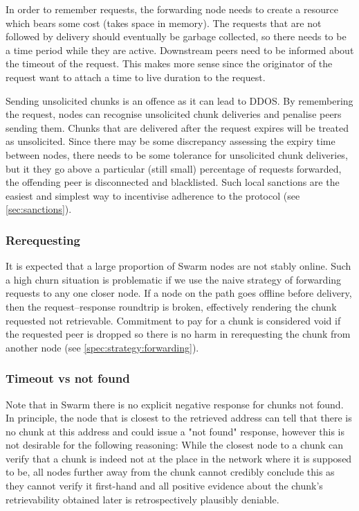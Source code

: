 In order to remember requests, the forwarding node needs to create a resource which bears some cost (takes space in memory). The requests that are not followed by delivery should eventually be garbage collected, so there needs to be a time period while they are active. Downstream peers need to be informed about the timeout of the request. This makes more sense since the originator of the request want to attach a time to live duration to the request.  

Sending unsolicited chunks is an offence as it can lead to DDOS. By remembering the request, nodes can recognise unsolicited chunk deliveries and penalise peers sending them. Chunks that are delivered after the request expires will be treated as unsolicited. Since there may be some discrepancy assessing the expiry time between nodes, there needs to be some tolerance for unsolicited chunk deliveries, but it they go above a particular (still small) percentage of requests forwarded, the offending peer is disconnected and blacklisted. Such local sanctions are the easiest and simplest way to incentivise adherence to the protocol (see \ref{sec:sanctions}). 

\subsubsection{Rerequesting}

It is expected that a large proportion of Swarm nodes are not stably online. Such a high churn situation is problematic if we use the naive strategy of forwarding requests to any one closer node. If a node on the path goes offline before delivery, then the request--response roundtrip is broken, effectively rendering the chunk requested not retrievable. Commitment to pay for a chunk is considered void if the requested peer is dropped so there is no harm in rerequesting the chunk from another node (see \ref{spec:strategy:forwarding}).


\subsubsection{Timeout vs not found}

Note that in Swarm there is no explicit negative response for chunks not found. In principle, the node that is closest to the retrieved address can tell that there is no chunk at this address and could issue a "not found" response, however this is not desirable for the following reasoning: While the closest node to a chunk can verify that a chunk is indeed not at the place in the network where it is supposed to be, all nodes further away from the chunk cannot credibly conclude this as they cannot verify it first-hand and all positive evidence about the chunk's retrievability obtained later is retrospectively plausibly deniable. 

